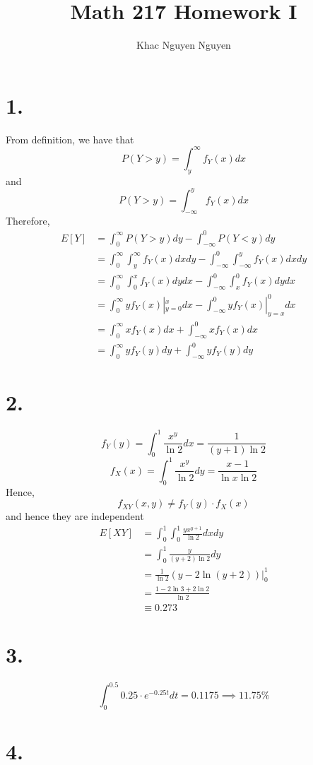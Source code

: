 \documentclass[11pt]{article}
\title{\textbf{Math 217 Homework I}}
\author{Khac Nguyen Nguyen}
\date{}
\begin{document}
\section*{1.}
From definition, we have that
\[
    P(Y>y) = \int_y^\infty f_Y(x) dx 
\]
and
\[
    P(Y>y) = \int_{-\infty}^y f_Y(x) dx 
\]
Therefore, 
\begin{equation*}
    \begin{aligned}
        E[Y] 
        &= \int_0^\infty P(Y>y) dy - \int_{-\infty}^0 P(Y<y) dy \\
        &= \int_0^\infty \int_y^{\infty} f_Y(x) dxdy - \int_{-\infty}^0 \int_{-\infty}^y f_Y(x) dxdy \\
        &= \int_0^\infty \int_0^x f_Y(x) dydx - \int_{-\infty}^0 \int_{x}^0 f_Y(x) dydx \\
        &= \int_0^\infty yf_Y(x)|^x_{y=0} dx - \int_{-\infty}^0 yf_Y(x)|^0_{y=x} dx \\
        &= \int_0^\infty xf_Y(x) dx + \int_{-\infty}^0 xf_Y(x) dx\\
        &= \int_0^\infty yf_Y(y) dy + \int_{-\infty}^0 yf_Y(y) dy
    \end{aligned}
\end{equation*}
\pagebreak
\section*{2.}
\[
    f_Y(y) = \int_0^1 \frac{x^y}{\ln2} dx = \frac{1}{(y+1)\ln2} 
\]
\[
    f_X(x) = \int_0^1 \frac{x^y}{\ln2} dy =  \frac{x-1}{\ln x \ln2}    
\]
Hence, 
\[
    f_{XY}(x,y) \ne f_Y(y) \cdot f_X(x)     
\]
and hence they are independent
\begin{equation*}
    \begin{aligned}
        E[XY] 
        &= \int_0^1 \int_0^1 \frac{yx^{y+1}}{\ln2} dx dy  \\
        &= \int_0^1 \frac{y}{(y+2)\ln2}dy \\
        &= \frac{1}{\ln2} (y-2\ln(y+2))|^1_0 \\
        &= \frac{1-2\ln3 + 2\ln2}{\ln2} \\
        &\equiv 0.273
    \end{aligned}
\end{equation*}
\pagebreak
\section*{3.}
\[
    \int_0^{0.5} 0.25 \cdot e^{-0.25t} dt = 0.1175 \implies 11.75\%
\]
\pagebreak
\section*{4.}
\end{document}
